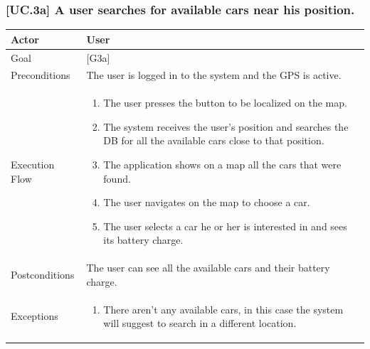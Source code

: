 \documentclass[english]{article}
\begin{document}
	\subsubsection{[UC.3a] A user searches for available cars near his position.}
	\begin{tabularx}{\textwidth}{  l  X  }
		\hline
		Actor & User\\
		\hline
		Goal & [G3a]\\
		\hline
		Preconditions & The user is logged in to the system and the GPS is active.\\
		\hline
		Execution Flow & \begin{enumerate}
			\item{The user presses the button to be localized on the map.}
			\item{The system receives the user's position and searches the DB for all the available cars close to that position.}
			\item{The application shows on a map all the cars that were found.}
			\item{The user navigates on the map to choose a car.}
			\item{The user selects a car he or her is interested in and sees its battery charge.}
		\end{enumerate}\\
		\hline
		Postconditions & The user can see all the available cars and their battery charge.\\
		\hline
		Exceptions & \begin{enumerate}
			\item{There aren't any available cars, in this case the system will suggest to search in a different location.}
		\end{enumerate}\\
		\hline
	\end{tabularx}
\end{document}
